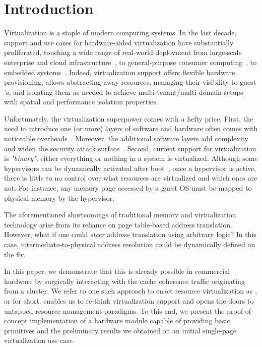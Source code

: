 \section{Introduction}
    \label{sec:introduction}

    Virtualization is a staple of modern computing systems.
    In the last decade, support and use cases for hardware-aided virtualization have substantially proliferated, touching a wide range of real-world deployment from large-scale enterprise and cloud infrastructure~\cite{virt_cloud}, to general-purpose consumer computing~\cite{wolf2006virtualization}, to embedded systems~\cite{virt_embedded,shedding-light}. Indeed, virtualization support offers flexible hardware provisioning, 
    allows abstracting away resources, managing their visibility to guest \os's, and isolating them as needed to achieve multi-tenant/multi-domain setups with spatial and performance isolation properties. 
        
    Unfortunately, the virtualization superpower comes with a hefty price.
    First, the need to introduce one (or more) layers of software and hardware often comes with noticeable overheads~\cite{virt_overhead}.
    Moreover, the additional software layers add complexity and widen the security attack surface~\cite{security_hyper}.
    Second, current support for virtualization is \textit{"binary"}, \ie either everything or nothing in a system is virtualized.
    Although some hypervisors can be dynamically activated after boot~\cite{jailhouse}, once a hypervisor is active, there is little to no control over what resources are virtualized and which ones are not.
    For instance, any memory page accessed by a guest OS must be mapped to physical memory by the hypervisor. 
    
    The aforementioned shortcomings of traditional memory and \io virtualization technology arise from its reliance on page table-based address translation.
    However, what if one could \emph{steer} address translation using arbitrary logic?
    In this case, intermediate-to-physical address resolution could be dynamically defined on the fly.
    
    In this paper, we demonstrate that this is already possible in commercial hardware by surgically interacting with the cache coherence traffic originating from a \cpu cluster.
    We refer to one such approach to enact resource virtualization as \emph{\snamefull}, or \sname for short.
    \sname enables us to re-think virtualization support and opens the doors to untapped resource management paradigms.
    To this end, we present the proof-of-concept implementation of a hardware module capable of providing basic \sname primitives and the preliminary results we obtained on an initial single-page virtualization use case.
    